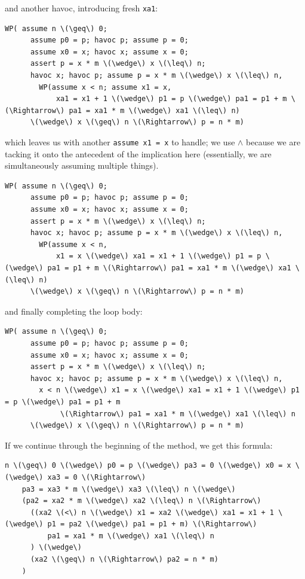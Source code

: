 \newpage
and another \textsf{havoc}, introducing fresh \texttt{xa1}:
\begin{Verbatim}[commandchars=\\\{\}]
  WP( assume n \(\geq\) 0;
      assume p0 = p; havoc p; assume p = 0; 
      assume x0 = x; havoc x; assume x = 0; 
      assert p = x * m \(\wedge\) x \(\leq\) n;
      havoc x; havoc p; assume p = x * m \(\wedge\) x \(\leq\) n,
        WP(assume x < n; assume x1 = x,
            xa1 = x1 + 1 \(\wedge\) p1 = p \(\wedge\) pa1 = p1 + m \(\Rightarrow\) pa1 = xa1 * m \(\wedge\) xa1 \(\leq\) n)
      \(\wedge\) x \(\geq\) n \(\Rightarrow\) p = n * m)
\end{Verbatim}
which leaves us with another \texttt{assume x1 = x} to handle; we use $\wedge$ because we are tacking it onto the antecedent of the implication here (essentially, we are simultaneously assuming multiple things).
\begin{Verbatim}[commandchars=\\\{\}]
  WP( assume n \(\geq\) 0;
      assume p0 = p; havoc p; assume p = 0; 
      assume x0 = x; havoc x; assume x = 0; 
      assert p = x * m \(\wedge\) x \(\leq\) n;
      havoc x; havoc p; assume p = x * m \(\wedge\) x \(\leq\) n,
        WP(assume x < n,  
            x1 = x \(\wedge\) xa1 = x1 + 1 \(\wedge\) p1 = p \(\wedge\) pa1 = p1 + m \(\Rightarrow\) pa1 = xa1 * m \(\wedge\) xa1 \(\leq\) n)
      \(\wedge\) x \(\geq\) n \(\Rightarrow\) p = n * m)
\end{Verbatim}
and finally completing the loop body:
\begin{Verbatim}[commandchars=\\\{\}]
  WP( assume n \(\geq\) 0;
      assume p0 = p; havoc p; assume p = 0; 
      assume x0 = x; havoc x; assume x = 0; 
      assert p = x * m \(\wedge\) x \(\leq\) n;
      havoc x; havoc p; assume p = x * m \(\wedge\) x \(\leq\) n,
        x < n \(\wedge\) x1 = x \(\wedge\) xa1 = x1 + 1 \(\wedge\) p1 = p \(\wedge\) pa1 = p1 + m
             \(\Rightarrow\) pa1 = xa1 * m \(\wedge\) xa1 \(\leq\) n
      \(\wedge\) x \(\geq\) n \(\Rightarrow\) p = n * m)
\end{Verbatim}
If we continue through the beginning of the method, we get this formula:
\begin{Verbatim}[commandchars=\\\{\}]
  n \(\geq\) 0 \(\wedge\) p0 = p \(\wedge\) pa3 = 0 \(\wedge\) x0 = x \(\wedge\) xa3 = 0 \(\Rightarrow\)
    pa3 = xa3 * m \(\wedge\) xa3 \(\leq\) n \(\wedge\)
    (pa2 = xa2 * m \(\wedge\) xa2 \(\leq\) n \(\Rightarrow\)
      ((xa2 \(<\) n \(\wedge\) x1 = xa2 \(\wedge\) xa1 = x1 + 1 \(\wedge\) p1 = pa2 \(\wedge\) pa1 = p1 + m) \(\Rightarrow\)
          pa1 = xa1 * m \(\wedge\) xa1 \(\leq\) n
      ) \(\wedge\)
      (xa2 \(\geq\) n \(\Rightarrow\) pa2 = n * m)
    )
\end{Verbatim}
